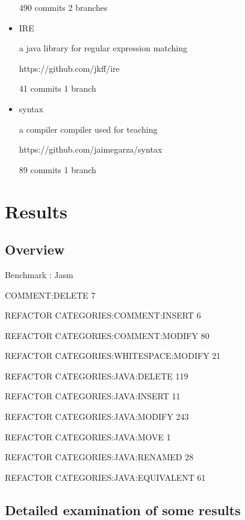 \begin{itemize}
  490 commits 2 branches

  \item  IRE
  
  a java library for regular expression matching
  
  https://github.com/jkff/ire
  
  41 commits 1 branch
  
  \item syntax
  
  a compiler compiler used for teaching
  
  https://github.com/jaimegarza/syntax
  
  89 commits 1 branch
    
\end{itemize}




\section{Results}
\subsection{Overview}
Benchmark : Jasm 


COMMENT:DELETE 7

REFACTOR CATEGORIES:COMMENT:INSERT 6

REFACTOR CATEGORIES:COMMENT:MODIFY 80

REFACTOR CATEGORIES:WHITESPACE:MODIFY 21

REFACTOR CATEGORIES:JAVA:DELETE 119

REFACTOR CATEGORIES:JAVA:INSERT 11

REFACTOR CATEGORIES:JAVA:MODIFY 243

REFACTOR CATEGORIES:JAVA:MOVE 1

REFACTOR CATEGORIES:JAVA:RENAMED 28

REFACTOR CATEGORIES:JAVA:EQUIVALENT 61


\subsection{Detailed examination of some results}

